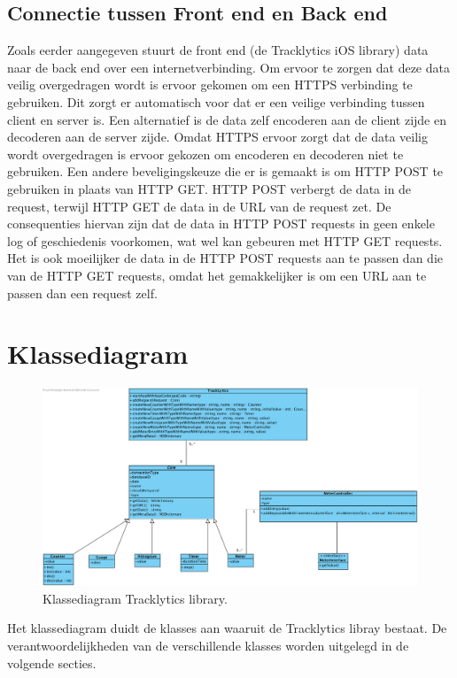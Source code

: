 \subsection{Connectie tussen Front end en Back end}
Zoals eerder aangegeven stuurt de front end (de Tracklytics iOS library) data naar de back end over een internetverbinding. Om ervoor te zorgen dat deze data veilig overgedragen wordt is ervoor gekomen om een HTTPS verbinding te gebruiken. Dit zorgt er automatisch voor dat er een veilige verbinding tussen client en server is. Een alternatief is de data zelf encoderen aan de client zijde en decoderen aan de server zijde. Omdat HTTPS ervoor zorgt dat de data veilig wordt overgedragen is ervoor gekozen om encoderen en decoderen niet te gebruiken.
Een andere beveligingskeuze die er is gemaakt is om HTTP POST te gebruiken in plaats van HTTP GET. HTTP POST verbergt de data in de request, terwijl HTTP GET de data in de URL van de request zet. De consequenties hiervan zijn dat de data in HTTP POST requests in geen enkele log of geschiedenis voorkomen, wat wel kan gebeuren met HTTP GET requests. Het is ook moeilijker de data in de HTTP POST requests aan te passen dan die van de HTTP GET requests, omdat het gemakkelijker is om een URL aan te passen dan een request zelf.\\


\section{Klassediagram} \label{sec:Klassediagram}
\begin{figure}[!h]
  \centering
  \includegraphics[scale=0.4]{Afbeeldingen/Implementatie/ClassDiagram}
  \caption{Klassediagram Tracklytics library.}
  \label{fig:fig}
\end{figure}

Het klassediagram duidt de klasses aan waaruit de Tracklytics libray bestaat. De verantwoordelijkheden van de verschillende klasses worden uitgelegd in de volgende secties.

